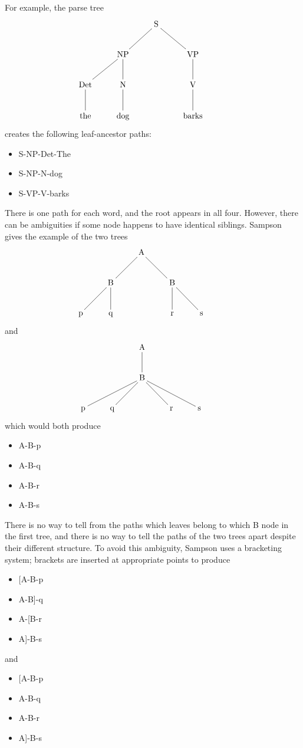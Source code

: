 \documentclass[11pt,letterpaper]{article}
\begin{document}
For example, the parse tree
\[\xymatrix{
  &&\textrm{S} \ar@{-}[dl] \ar@{-}[dr] &&\\
  &\textrm{NP} \ar@{-}[d] \ar@{-}[dl] &&\textrm{VP} \ar@{-}[d]\\
  \textrm{Det} \ar@{-}[d] & \textrm{N} \ar@{-}[d] && \textrm{V} \ar@{-}[d] \\
\textrm{the}& \textrm{dog} && \textrm{barks}\\}
\]
creates the following leaf-ancestor paths:

\begin{itemize}
\item S-NP-Det-The
\item S-NP-N-dog
\item S-VP-V-barks
\end{itemize}

There is one path for each word, and the root appears
in all four. However, there can be ambiguities if some
node happens
to have identical siblings. Sampson gives the example
of the two trees
\[\xymatrix{
  &&\textrm{A} \ar@{-}[dl] \ar@{-}[dr] &&&\\
  &\textrm{B} \ar@{-}[d] \ar@{-}[dl] &&\textrm{B} \ar@{-}[d] \ar@{-}[dr] & \\
  \textrm{p} & \textrm{q} && \textrm{r} & \textrm{s} \\
}
\]
and
\[\xymatrix{
  &&\textrm{A} \ar@{-}[d] &&&\\
  &&\textrm{B} \ar@{-}[dll] \ar@{-}[dl] \ar@{-}[dr] \ar@{-}[drr]&&& \\
  \textrm{p} & \textrm{q} && \textrm{r} & \textrm{s} \\
}
\]
which would both produce

  \begin{itemize}
  \item A-B-p
  \item A-B-q
  \item A-B-r
  \item A-B-s
  \end{itemize}

  There is no way to tell from the paths which leaves belong to which
  B node in the first tree, and there is no way to tell the paths of
  the two trees apart despite their different structure. To avoid this
  ambiguity, Sampson uses a bracketing system; brackets are inserted
  at appropriate points to produce
  \begin{itemize}
  \item $[$A-B-p
  \item A-B]-q
  \item A-[B-r
  \item A]-B-s
  \end{itemize}
and
  \begin{itemize}
  \item $[$A-B-p
  \item A-B-q
  \item A-B-r
  \item A]-B-s
  \end{itemize}
\end{document}
